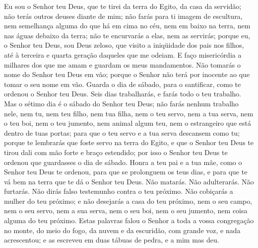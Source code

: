 Eu sou o Senhor teu Deus, que te tirei da terra do Egito, da casa
da servidão; não terás outros deuses diante de mim; não
farás para ti imagem de escultura, nem semelhança alguma do que há
em cima no céu, nem em baixo na terra, nem nas águas debaixo da
terra; não te encurvarás a elas, nem as servirás; porque eu, o
Senhor teu Deus, sou Deus zeloso, que visito a iniqüidade dos pais
nos filhos, até à terceira e quarta geração daqueles que me odeiam.
E faço misericórdia a milhares dos que me amam e guardam os
meus mandamentos. Não tomarás o nome do Senhor teu Deus em
vão; porque o Senhor não terá por inocente ao que tomar o seu nome
em vão. Guarda o dia de sábado, para o santificar, como te
ordenou o Senhor teu Deus. Seis dias trabalharás, e farás
todo o teu trabalho. Mas o sétimo dia é o sábado do Senhor
teu Deus; não farás nenhum trabalho nele, nem tu, nem teu filho, nem
tua filha, nem o teu servo, nem a tua serva, nem o teu boi, nem o
teu jumento, nem animal algum teu, nem o estrangeiro que está dentro
de tuas portas; para que o teu servo e a tua serva descansem como
tu; porque te lembrarás que foste servo na terra do Egito, e
que o Senhor teu Deus te tirou dali com mão forte e braço estendido;
por isso o Senhor teu Deus te ordenou que guardasses o dia de
sábado. Honra a teu pai e a tua mãe, como o Senhor teu Deus
te ordenou, para que se prolonguem os teus dias, e para que te vá
bem na terra que te dá o Senhor teu Deus. Não matarás.
Não adulterarás. Não furtarás. Não dirás falso
testemunho contra o teu próximo. Não cobiçarás a mulher do
teu próximo; e não desejarás a casa do teu próximo, nem o seu campo,
nem o seu servo, nem a sua serva, nem o seu boi, nem o seu jumento,
nem coisa alguma do teu próximo. Estas palavras falou o
Senhor a toda a vossa congregação no monte, do meio do fogo, da
nuvem e da escuridão, com grande voz, e nada acrescentou; e as
escreveu em duas tábuas de pedra, e a mim mas deu.

